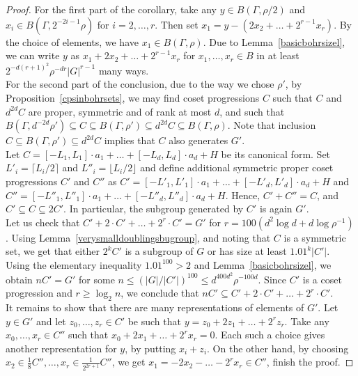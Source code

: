 \documentclass[a4paper,11pt]{article}
\numberwithin{theorem}{section}
\theoremstyle{definition}
\begin{document}
\begin{proof}
    For the first part of the corollary, take any $y \in B(\Gamma, \rho/2)$ and $x_i \in B(\Gamma, 2^{-2i-1}\rho)$ for $i = 2, \dots, r$. Then set $x_1 = y - (2x_2 + \dots + 2^{r-1}x_{r})$. By the choice of elements, we have $x_1 \in B(\Gamma, \rho)$. Due to Lemma~\ref{basicbohrsizel}, we can write $y$ as $x_1 + 2x_2 + \dots + 2^{r-1}x_{r}$ for $x_1, \dots, x_r \in B$ in at least $2^{-d(r+1)^2}\rho^{-dr}|G|^{r-1}$ many ways.\\
    
    For the second part of the conclusion, due to the way we chose $\rho'$, by Proposition~\ref{cpsinbohrsets}, we may find coset progressions $C$ such that $C$ and $d^{2d} C$ are proper, symmetric and of rank at most $d$, and such that $B(\Gamma, d^{-2d}\rho') \subseteq C\subseteq B(\Gamma, \rho') \subseteq  d^{2d} C\subseteq B(\Gamma, \rho)$. Note that inclusion $C\subseteq B(\Gamma, \rho') \subseteq d^{2d} C$ implies that $C$ also generates $G'$.\\

    Let $C = [-L_1, L_1] \cdot a_1 + \dots + [-L_d, L_d] \cdot a_d + H$ be its canonical form. Set $L'_i = \lceil L_i/2 \rceil$ and $L''_i = \lfloor L_i/2\rfloor$ and define additional symmetric proper coset progressions $C'$ and $C''$ as $C' = [-L'_1, L'_1] \cdot a_1 + \dots + [-L'_d, L'_d] \cdot a_d + H$  and $C'' = [-L''_1, L''_1] \cdot a_1 + \dots + [-L''_d, L''_d] \cdot a_d + H$. Hence, $C' + C'' = C$, and $C' \subseteq C \subseteq 2C'$. In particular, the subgroup generated by $C'$ is again $G'$.\\
    
    Let us check that $C' + 2\cdot C' + \dots + 2^r \cdot C' = G'$ for $r = 100 (d^2 \log d + d \log \rho^{-1})$. Using Lemma~\ref{verysmalldoublingsbugroup}, and noting that $C$ is a symmetric set, we get that either $2^k C'$ is a subgroup of $G$ or has size at least $1.01^k |C'|$. Using the elementary inequality $1.01^{100} > 2$ and Lemma~\ref{basicbohrsizel}, we obtain $n C' = G'$ for some $n \leq (|G| / |C'|)^{100} \leq d^{400 d^2}\rho^{-100 d}$. Since $C'$ is a coset progression and $r \geq \log_2 n$, we conclude that $n C' \subseteq C' + 2\cdot C' + \dots + 2^r \cdot C'$.\\
    
    It remains to show that there are many representations of elements of $G'$. Let $y \in G'$ and let $z_0, \dots, z_r \in C'$ be such that $y = z_0 + 2z_1 + \dots + 2^r z_r$. Take any $x_0, \dots, x_r \in C''$ such that $x_0 + 2x_1 + \dots + 2^rx_{r} = 0$. Each such a choice gives another representation for $y$, by putting $x_i + z_i$. On the other hand, by choosing $x_2 \in \frac{1}{8} C'', \dots, x_r \in \frac{1}{2^{2r + 1}} C''$, we get $x_1 = -2x_2 - \dots - 2^r x_r \in C''$, finish the proof.
\end{proof}
\end{document}
